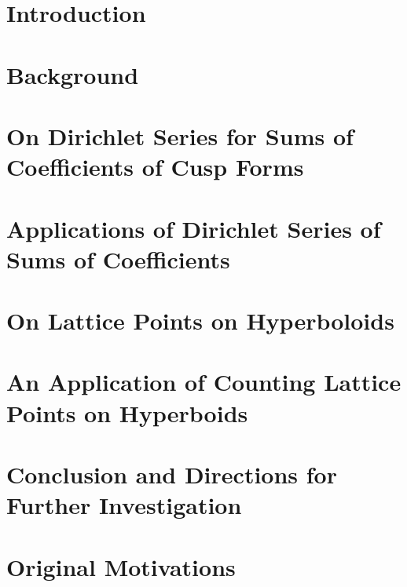 \documentclass[12pt]{report}   %
\theoremstyle{definition}
\begin{document}
\chapter{Introduction}\label{c:introduction}

\clearpage{\pagestyle{empty}\cleardoublepage}

\chapter{Background}\label{c:background}

\clearpage{\pagestyle{empty}\cleardoublepage}

\chapter{On Dirichlet Series for Sums of Coefficients of Cusp Forms}\label{c:sums}

\clearpage{\pagestyle{empty}\cleardoublepage}

\chapter{Applications of Dirichlet Series of Sums of Coefficients}\label{c:sums_apps}

\clearpage{\pagestyle{empty}\cleardoublepage}

\chapter{On Lattice Points on Hyperboloids}\label{c:hyperboloid}

\clearpage{\pagestyle{empty}\cleardoublepage}

\chapter{An Application of Counting Lattice Points on Hyperboids}\label{c:hyperboloid_apps}

\clearpage{\pagestyle{empty}\cleardoublepage}

\chapter{Conclusion and Directions for Further Investigation}\label{c:conclusion}

\clearpage{\pagestyle{empty}\cleardoublepage}

\chapter{Original Motivations}\label{c:motivations}

\clearpage{\pagestyle{empty}\cleardoublepage}
\end{document}
